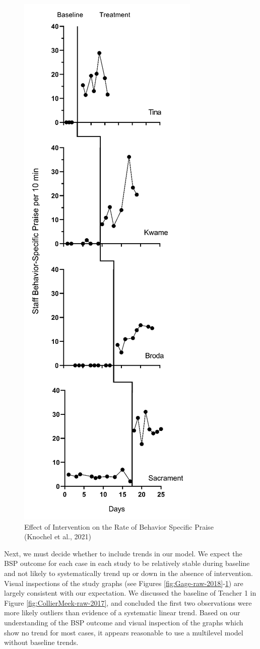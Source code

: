 \documentclass[
]{book}
\begin{document}
\begin{figure}
\includegraphics[width=0.6\linewidth]{images/Knochel2021} \caption{Effect of Intervention on the Rate of Behavior Specific Praise (Knochel et al., 2021)}\label{fig:Knochel-raw-2021}
\end{figure}

Next, we must decide whether to include trends in our model. We expect the BSP outcome for each case in each study to be relatively stable during baseline and not likely to systematically trend up or down in the absence of intervention. Visual inspections of the study graphs (see Figures \ref{fig:Gage-raw-2018}-\ref{fig:Knochel-raw-2021}) are largely consistent with our expectation. We discussed the baseline of Teacher 1 in Figure \ref{fig:CollierMeek-raw-2017}, and concluded the first two observations were more likely outliers than evidence of a systematic linear trend. Based on our understanding of the BSP outcome and visual inspection of the graphs which show no trend for most cases, it appears reasonable to use a multilevel model without baseline trends.
\end{document}
